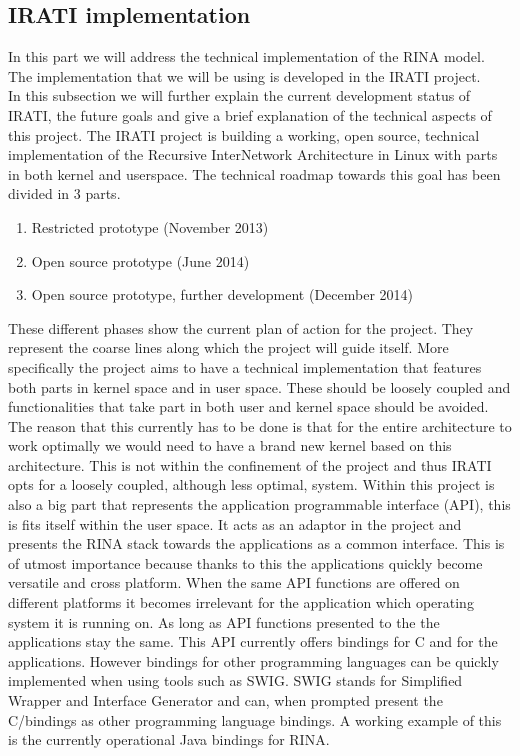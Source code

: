 \subsection{IRATI implementation}

In this part we will address the technical implementation of the RINA model. The implementation that we will be using is developed in the IRATI project. 
\\
In this subsection we will further explain the current development status of IRATI, the future goals and give a brief explanation of the technical aspects of this project.
\npar
The IRATI project is building a working, open source, technical implementation of the Recursive InterNetwork Architecture in Linux with parts in both kernel and userspace\citep{website:IRATI-obj}. The technical roadmap towards this goal has been divided in 3 parts. 

\begin{enumerate}
	\item Restricted prototype (November 2013)
	\item Open source prototype (June 2014)
	\item Open source prototype, further development (December 2014)
\end{enumerate}

These different phases show the current plan of action for the project. They represent the coarse lines along which the project will guide itself. More specifically the project aims to have a technical implementation that features both parts in kernel space and in user space. These should be loosely coupled and functionalities that take part in both user and kernel space should be avoided. The reason that this currently has to be done is that for the entire architecture to work optimally we would need to have a brand new kernel based on this architecture. This is not within the confinement of the project and thus IRATI opts for a loosely coupled, although less optimal, system. Within this project is also a big part that represents the application programmable interface (API), this is fits itself within the user space. It acts as an adaptor in the project and presents the RINA stack towards the applications as a common interface. This is of utmost importance because thanks to this the applications quickly become versatile and cross platform. When the same API functions are offered on different platforms it becomes irrelevant for the application which operating system it is running on. As long as API functions presented to the the applications stay the same. This API currently offers bindings for C and \cpp for the applications. However bindings for other programming languages can be quickly implemented when using tools such as SWIG. SWIG stands for Simplified Wrapper and Interface Generator and can, when prompted present the C/\cpp bindings as other programming language bindings. A working example of this is the currently operational Java bindings for RINA. 

